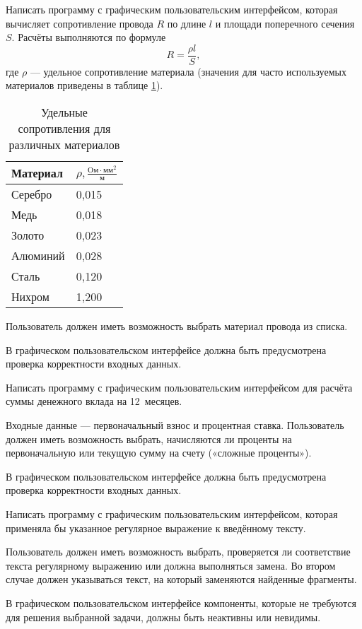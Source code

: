 \task Написать программу с графическим пользовательским интерфейсом,
которая вычисляет сопротивление провода $R$ по длине $l$ и площади
поперечного сечения $S$. Расчёты
выполняются по формуле
\[
R = \frac{\rho l}{S},
\]
где $\rho$ — удельное сопротивление материала (значения для часто
используемых материалов приведены в таблице \ref{table:resistance}).

\begin{table}
  \centering
  \begin{tabular}{l|l}
    Материал&$\rho, \frac{\textrm{Ом}\cdot\textrm{мм}^2}{\textrm{м}}$\\
    \hline
    Серебро  & 0{,}015 \\
    Медь     & 0{,}018 \\
    Золото   & 0{,}023 \\
    Алюминий & 0{,}028 \\
    Сталь    & 0{,}120 \\
    Нихром   & 1{,}200
  \end{tabular}
  \caption{Удельные сопротивления для различных материалов}
  \label{table:resistance}
\end{table}

Пользователь должен иметь возможность выбрать материал провода из списка.

В графическом пользовательском интерфейсе должна быть предусмотрена
проверка корректности входных данных.

\task Написать программу с графическим пользовательским интерфейсом
для расчёта суммы денежного вклада на 12~месяцев.

Входные данные — первоначальный взнос и процентная
ставка. Пользователь должен иметь возможность выбрать, начисляются ли
проценты на первоначальную или текущую сумму на счету («сложные
проценты»).

В графическом пользовательском интерфейсе должна быть предусмотрена
проверка корректности входных данных.

\task Написать программу с графическим пользовательским интерфейсом,
которая применяла бы указанное регулярное выражение к введённому
тексту.

Пользователь должен иметь возможность выбрать, проверяется ли
соответствие текста регулярному выражению или должна выполняться
замена. Во втором случае должен указываться текст, на который
заменяются найденные фрагменты.

В графическом пользовательском интерфейсе компоненты, которые не
требуются для решения выбранной задачи, должны быть неактивны или
невидимы.

